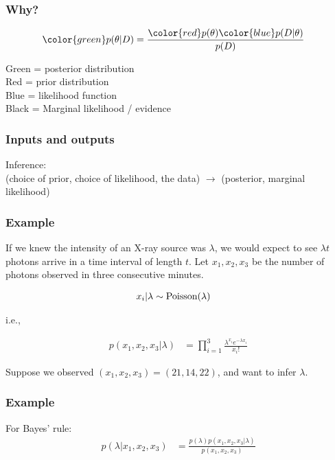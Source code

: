\documentclass{beamer}
\begin{document}
\begin{frame}
\frametitle{Why?}


\begin{align}
{\color{green}p(\theta | D)} &= \frac{{\color{red}p(\theta)}{\color{blue}p(D|\theta)}}{p(D)}
\end{align}

Green = posterior distribution\\
Red = prior distribution\\
Blue = likelihood function\\
Black = Marginal likelihood / evidence

\end{frame}


\begin{frame}
\frametitle{Inputs and outputs}

Inference:\\ (choice of prior, choice of likelihood, the data) $\to$ (posterior, marginal likelihood)

\end{frame}


\begin{frame}
\frametitle{Example}

If we knew the intensity of an X-ray source was $\lambda$, we would expect
to see $\lambda t$ photons arrive in a time interval of length $t$.
Let $x_1, x_2, x_3$ be the number of photons observed in three consecutive
minutes.

\begin{align}
x_i | \lambda &\sim \textnormal{Poisson}(\lambda)
\end{align}

i.e.,

\begin{align}
p(x_1, x_2, x_3 | \lambda) &= \prod_{i=1}^3 \frac{\lambda^{x_i} e^{-\lambda x_i}}{x_i!}
\end{align}

Suppose we observed $(x_1, x_2, x_3) = (21, 14, 22)$, and want to infer
$\lambda$.

\end{frame}

\begin{frame}
\frametitle{Example}

For Bayes' rule:
\begin{align}
p(\lambda | x_1, x_2, x_3) &= \frac{p(\lambda)p(x_1, x_2, x_3|\lambda)}{p(x_1, x_2, x_3)}
\end{align}


\end{frame}
\end{document}
